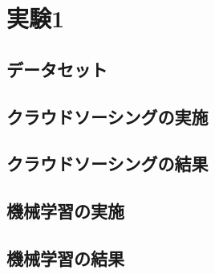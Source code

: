 \chapter{実験1}
\section{データセット}
\section{クラウドソーシングの実施}
\section{クラウドソーシングの結果}
\section{機械学習の実施}
\section{機械学習の結果}